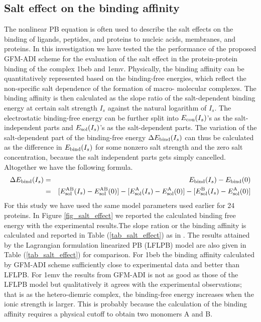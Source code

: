 \subsection{Salt effect on the binding affinity}
The nonlinear PB equation is often used to describe the salt effects on the binding of ligands, peptides, and proteins to nucleic acids, membranes, and proteins. In this investigation we have tested the the performance of the proposed GFM-ADI scheme for the evaluation of the salt effect in the protein-protein binding of the complex 1beb and 1emv. Physically, the binding affinity can be quantitatively represented based on the binding-free energies, which reflect the non-specific salt dependence of the formation of macro- molecular complexes. The binding affinity is then calculated as the slope ratio of the salt-dependent binding energy at certain salt strength $I_s$ against the natural logarithm of $I_s$.
The electrostatic binding-free energy can be further split into $E_{\rm cou}(I_s)$'s as the salt-independent parts and $E_{\rm sol}(I_s)$'s as the salt-dependent parts. The variation of the salt-dependent part of the binding-free energy $\Delta E_{\rm bind}(I_s)$ can thus be calculated as the difference in $E_{\rm bind}(I_s)$ for some nonzero salt strength and the zero salt concentration, because the salt independent parts gets simply cancelled. Altogether we have the following formula.\\
\begin{eqnarray}
	\Delta E_{\rm bind}(I_s) &=& E_{\rm bind}(I_s)- E_{\rm bind}(0)\label{eq_del_e_bind} \nonumber\\
						 &=& [E_{\rm sol}^{\rm AB}(I_s)-E_{\rm sol}^{\rm AB}(0)]-[E_{\rm sol}^{\rm A}(I_s)-E_{\rm sol}^{\rm A}(0)]- [E_{\rm sol}^{\rm B}(I_s)-E_{\rm sol}^{\rm A}(0)]\end{eqnarray}
For this study we have used the same model parameters used earlier for 24 proteins. In Figure \ref{fig_salt_effect} we reported the calculated binding free energy with the experimental results.The slope ration or the binding affinity is calculated and reported in Table (\ref{tab_salt_effect}) as in \cite{zhao_pseudo-time-coupled_2011}. The results attained by the Lagrangian formulation linearized PB (LFLPB) model \cite{Zhan_2011} are also given in Table (\ref{tab_salt_effect}) for comparison. For 1beb the binding affinity calculated by GFM-ADI scheme sufficiently close to experimental data and better than LFLPB. For 1emv the results from  GFM-ADI is not as good as those of the LFLPB model but qualitatively it agrees with the experimental observations; that is as the hetero-diemric complex, the binding-free energy increases when the ionic strength is larger. This is probably because the calculation of the binding affinity requires a physical cutoff to obtain two monomers A and B.     	
